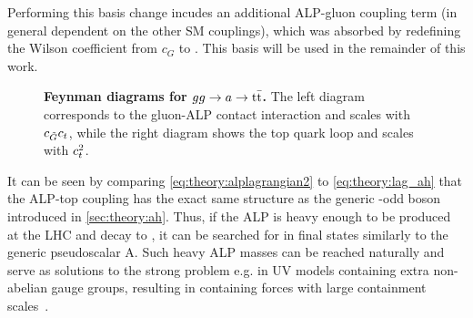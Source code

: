 Performing this basis change incudes an additional ALP-gluon coupling term (in general dependent on the other SM couplings), which was absorbed by redefining the Wilson coefficient from $c_G$ to \cG. This basis will be used in the remainder of this work. 

\begin{figure}[!t]
    \centering
    \quad \quad
    \caption{\textbf{Feynman diagrams for $gg \rightarrow a \rightarrow \mathrm{t \bar{t}}$.} The left diagram corresponds to the gluon-ALP contact interaction and scales with $c_{\tilde{G}}c_t$, while the right diagram shows the top quark loop and scales with $c_t^2$.}
    \label{fig:theory:ggALP}
\end{figure}

It can be seen by comparing \cref{eq:theory:alplagrangian2} to \cref{eq:theory:lag_ah} that the ALP-top coupling has the exact same structure as the generic \CP-odd boson introduced in \cref{sec:theory:ah}. Thus, if the ALP is heavy enough to be produced at the LHC and decay to \ttbar, it can be searched for in \ttbar final states similarly to the generic pseudoscalar A. Such heavy ALP masses can  be reached naturally and serve as solutions to the strong \CP problem e.g. in UV models containing extra non-abelian gauge groups, resulting in containing forces with large containment scales~\cite{Rubakov:1997vp,Holdom:1982ex,Dimopoulos:2016lvn,Gherghetta:2016fhp}.

